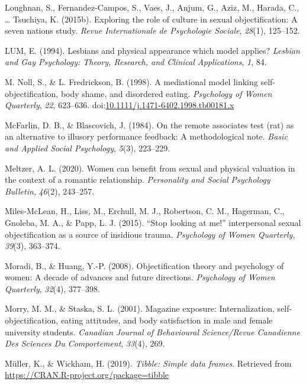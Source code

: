 \documentclass[
  man]{apa6}
\begin{document}
\hypertarget{ref-loughnan2015}{}
Loughnan, S., Fernandez-Campos, S., Vaes, J., Anjum, G., Aziz, M.,
Harada, C., \ldots{} Tsuchiya, K. (2015b). Exploring the role of culture
in sexual objectification: A seven nations study. \emph{Revue
Internationale de Psychologie Sociale}, \emph{28}(1), 125--152.

\hypertarget{ref-lum1994lesbians}{}
LUM, E. (1994). Lesbians and physical appearance which model applies?
\emph{Lesbian and Gay Psychology: Theory, Research, and Clinical
Applications}, \emph{1}, 84.

\hypertarget{ref-nollfredrickson1998}{}
M. Noll, S., \& L. Fredrickson, B. (1998). A mediational model linking
self-objectification, body shame, and disordered eating.
\emph{Psychology of Women Quarterly}, \emph{22}, 623--636.
doi:\href{https://doi.org/10.1111/j.1471-6402.1998.tb00181.x}{10.1111/j.1471-6402.1998.tb00181.x}

\hypertarget{ref-mcfarlin1984remote}{}
McFarlin, D. B., \& Blascovich, J. (1984). On the remote associates test
(rat) as an alternative to illusory performance feedback: A
methodological note. \emph{Basic and Applied Social Psychology},
\emph{5}(3), 223--229.

\hypertarget{ref-meltzer2020women}{}
Meltzer, A. L. (2020). Women can benefit from sexual and physical
valuation in the context of a romantic relationship. \emph{Personality
and Social Psychology Bulletin}, \emph{46}(2), 243--257.

\hypertarget{ref-miles2015stop}{}
Miles-McLean, H., Liss, M., Erchull, M. J., Robertson, C. M., Hagerman,
C., Gnoleba, M. A., \& Papp, L. J. (2015). ``Stop looking at me!''
interpersonal sexual objectification as a source of insidious trauma.
\emph{Psychology of Women Quarterly}, \emph{39}(3), 363--374.

\hypertarget{ref-moradi2008}{}
Moradi, B., \& Huang, Y.-P. (2008). Objectification theory and
psychology of women: A decade of advances and future directions.
\emph{Psychology of Women Quarterly}, \emph{32}(4), 377--398.

\hypertarget{ref-morry2001magazine}{}
Morry, M. M., \& Staska, S. L. (2001). Magazine exposure:
Internalization, self-objectification, eating attitudes, and body
satisfaction in male and female university students. \emph{Canadian
Journal of Behavioural Science/Revue Canadienne Des Sciences Du
Comportement}, \emph{33}(4), 269.

\hypertarget{ref-R-tibble}{}
Müller, K., \& Wickham, H. (2019). \emph{Tibble: Simple data frames}.
Retrieved from \url{https://CRAN.R-project.org/package=tibble}
\end{document}
